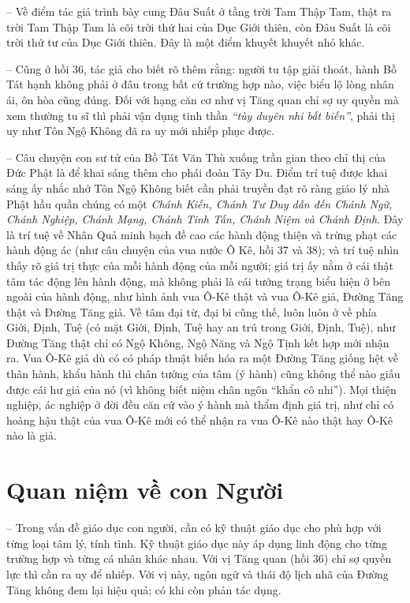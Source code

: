 -- Về điểm tác giả trình bày cung Đâu Suất ở tầng trời Tam Thập Tam, thật ra trời Tam Thập Tam là cõi trời thứ hai của Dục Giới thiên, còn Đâu Suất là cõi trời thứ tư của Dục Giới thiên. Đây là một điểm khuyết khuyết nhỏ khác.

-- Cũng ở hồi 36, tác giả cho biết rõ thêm rằng: người tu tập giải thoát, hành Bồ Tát hạnh không phải ở đâu trong bất cứ trường hợp nào, việc biểu lộ lòng nhân ái, ôn hòa cũng đúng. Đối với hạng căn cơ như vị Tăng quan chỉ sợ uy quyền mà xem thường tu sĩ thì phải vận dụng tinh thần \emph{``tùy duyên nhi bất biến''}, phải thị uy như Tôn Ngộ Không đã ra uy mới nhiếp phục được.

-- Câu chuyện con sư tử của Bồ Tát Văn Thù xuống trần gian theo chỉ thị của Đức Phật là để khai sáng thêm cho phái đoàn Tây Du. Điểm trí tuệ được khai sáng ấy nhắc nhở Tôn Ngộ Không biết cần phải truyền đạt rõ ràng giáo lý nhà Phật hầu quần chúng có một \emph{Chánh Kiến, Chánh Tư Duy dẫn đến Chánh Ngữ, Chánh Nghiệp, Chánh Mạng, Chánh Tinh Tấn, Chánh Niệm và Chánh Định}. Đây là trí tuệ về Nhân Quả minh bạch đề cao các hành động thiện và trừng phạt các hành động ác (như câu chuyện của vua nước Ô Kê, hồi 37 và 38); và trí tuệ nhìn thấy rõ giá trị thực của mỗi hành động của mỗi người; giá trị ấy nằm ở cái thật tâm tác động lên hành động, mà không phải là cái tướng trạng biểu hiện ở bên ngoài của hành động, như hình ảnh vua Ô-Kê thật và vua Ô-Kê giả, Đường Tăng thật và Đường Tăng giả. Về tâm đại từ, đại bi cũng thế, luôn luôn ở về phía Giới, Định, Tuệ (có mặt Giới, Định, Tuệ hay an trú trong Giới, Định, Tuệ), như Đường Tăng thật chỉ có Ngộ Không, Ngộ Năng và Ngộ Tịnh kết hợp mới nhận ra. Vua Ô-Kê giả dù có có pháp thuật biến hóa ra một Đường Tăng giống hệt về thân hành, khẩu hành thì chân tướng của tâm (ý hành) cũng không thể nào giấu được cái hư giả của nó (vì không biết niệm chân ngôn ``khẩn cô nhi''). Mọi thiện nghiệp, ác nghiệp ở đời đều căn cứ vào ý hành mà thẩm định giá trị, như chỉ có hoàng hậu thật của vua Ô-Kê mới có thể nhận ra vua Ô-Kê nào thật hay Ô-Kê nào là giả.

\section{Quan niệm về con Người} %
\label{sec:36_37_con_nguoi}

-- Trong vấn đề giáo dục con người, cần có kỹ thuật giáo dục cho phù hợp với từng loại tâm lý, tính tình. Kỹ thuật giáo dục này áp dụng linh động cho từng trường hợp và từng cá nhân khác nhau. Với vị Tăng quan (hồi 36) chỉ sợ quyền lực thì cần ra uy để nhiếp. Với vị này, ngôn ngữ và thái độ lịch nhã của Đường Tăng không đem lại hiệu quả; có khi còn phản tác dụng.

